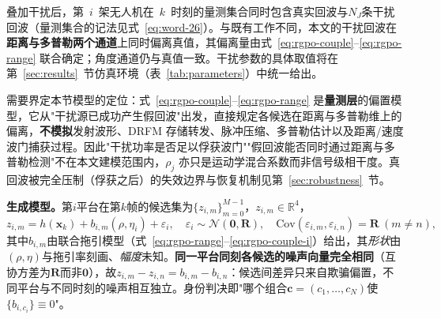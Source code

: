 \documentclass[UTF8,a4paper,zihao=-4]{ctexart}
\begin{document}
叠加干扰后，第~\(i\)~架无人机在~\(k\)~时刻的量测集合同时包含真实回波与\(N_J\)条干扰回波（量测集合的记法见式~\eqref{eq:word-26}）。与既有工作不同，本文的干扰回波在\textbf{距离与多普勒两个通道}上同时偏离真值，其偏离量由式~\eqref{eq:rgpo-couple}--\eqref{eq:rgpo-range} 联合确定；角度通道仍与真值一致。干扰参数的具体取值将在第~\ref{sec:results}~节仿真环境（表~\ref{tab:parameters}）中统一给出。

需要界定本节模型的定位：式~\eqref{eq:rgpo-couple}--\eqref{eq:rgpo-range} 是\textbf{量测层}的偏置模型，它从"干扰源已成功产生假回波"出发，直接规定各候选在距离与多普勒维上的偏离，\textbf{不模拟}发射波形、DRFM 存储转发、脉冲压缩、多普勒估计以及距离/速度波门捕获过程。因此"干扰功率是否足以俘获波门""假回波能否同时通过距离与多普勒检测"不在本文建模范围内，\(\rho_j\) 亦只是运动学混合系数而非信号级相干度。真回波被完全压制（俘获之后）的失效边界与恢复机制见第~\ref{sec:robustness}~节。

\noindent\textbf{生成模型。}\quad 第\(i\)平台在第\(k\)帧的候选集为\(\{z_{i,m}\}_{m=0}^{M-1}\)，\(z_{i,m}\in\mathbb R^4\)，
\begin{equation}
z_{i,m}=h(\boldsymbol x_k)+b_{i,m}(\rho,\eta_i)+\varepsilon_{i},\quad
\varepsilon_{i}\sim\mathcal N(\boldsymbol 0,\boldsymbol R),\quad
\mathrm{Cov}(\varepsilon_{i,m},\varepsilon_{i,n})=\boldsymbol R\ (m\neq n),
\label{eq:shared-noise}
\end{equation}
其中\(b_{i,m}\)由联合拖引模型（式~\eqref{eq:rgpo-range}--\eqref{eq:rgpo-couple-i}）给出，其\emph{形状}由\((\rho,\eta)\)与拖引率刻画、\emph{幅度}未知。\textbf{同一平台同刻各候选的噪声向量完全相同}（互协方差为\(\boldsymbol R\)而非\(\boldsymbol 0\)），故\(z_{i,m}-z_{i,n}=b_{i,m}-b_{i,n}\)：候选间差异只来自欺骗偏置，不同平台与不同时刻的噪声相互独立。身份判决即"哪个组合\(\boldsymbol c=(c_1,\dots,c_N)\)使\(\{b_{i,c_i}\}\equiv0\)"。
\end{document}
